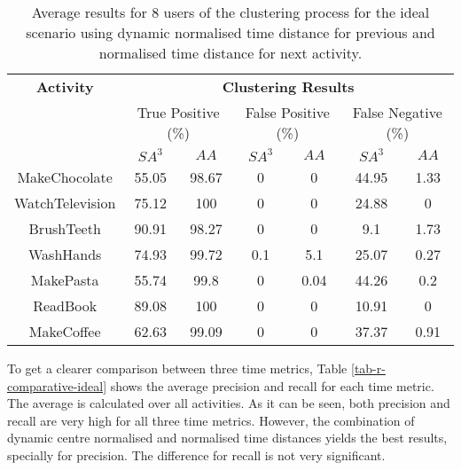 \begin{table}[htbp]\scriptsize
    \begin{center}    
        \begin{tabular}{ccccccc}
            \hline            
            \textbf{Activity} & \multicolumn{6}{c}{\textbf{Clustering Results}} \\
             & \multicolumn{2}{c}{True Positive (\%)} & \multicolumn{2}{c}{False Positive (\%)} & \multicolumn{2}{c}{False Negative (\%)} \\
             & $SA^3$ & $AA$ & $SA^3$ & $AA$ & $SA^3$ & $AA$ \\
            \hline
            MakeChocolate   & 55.05 & 98.67 & 0    & 0    & 44.95 & 1.33 \\
	    WatchTelevision & 75.12 & 100   & 0    & 0    & 24.88 & 0    \\
	    BrushTeeth      & 90.91 & 98.27 & 0    & 0    & 9.1   & 1.73 \\
	    WashHands       & 74.93 & 99.72 & 0.1  & 5.1  & 25.07 & 0.27 \\
	    MakePasta       & 55.74 & 99.8  & 0    & 0.04 & 44.26 & 0.2 \\
	    ReadBook        & 89.08 & 100   & 0    & 0    & 10.91 & 0 \\
	    MakeCoffee      & 62.63 & 99.09 & 0    & 0    & 37.37 & 0.91 \\
            \hline
        \end{tabular}
        \caption{Average results for 8 users of the clustering process for the ideal scenario using dynamic normalised time distance for previous and normalised time distance for next activity.}
        \label{tab-r-ideal-t3}
    \end{center}
\end{table}

To get a clearer comparison between three time metrics, Table \ref{tab-r-comparative-ideal} shows the average precision and recall for each time metric. The average is calculated over all activities. As it can be seen, both precision and recall are very high for all three time metrics. However, the combination of dynamic centre normalised and normalised time distances yields the best results, specially for precision. The difference for recall is not very significant. 

